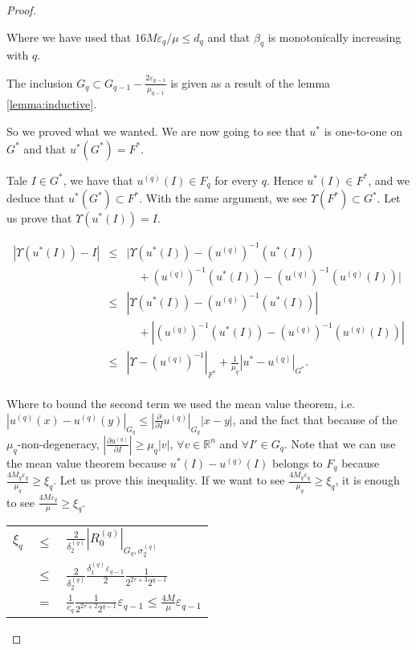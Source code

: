\begin{proof}
\begin{enumerate}
Where we have used that $16M\varepsilon_q/\mu\leq d_q$ and that $\beta_q$ is monotonically increasing with $q$.

The inclusion $G_q \subset G_{q-1} - \frac{2\varepsilon_{q-1}}{\mu_{q-1}}$ is given as a result of the lemma \ref{lemma:inductive}.

So we proved what we wanted. We are now going to see that $u^*$ is one-to-one on $G^*$ and that $u^*(G^*) = F^*$.

Tale $I\in G^*$, we have that $u^{(q)}(I)\in F_q$ for every $q$. Hence $u^*(I) \in F^*$, and we deduce that $u^*(G^*) \subset F^*$. With the same argument, we see $\Upsilon(F^*) \subset G^*$.
Let us prove that $\Upsilon(u^*(I))=I$.

$$
\begin{array}{rcl}
 |\Upsilon(u^*(I)) - I|& \leq & |\Upsilon(u^*(I)) - (u^{(q)})^{-1}(u^* (I)) \\
 & & \quad + (u^{(q)})^{-1}(u^*(I)) - (u^{(q)})^{-1}(u^{(q)}(I))|\\
 & \leq & |\Upsilon(u^*(I)) - (u^{(q)})^{-1}(u^* (I))| \\
 & & \quad + |(u^{(q)})^{-1}(u^*(I)) - (u^{(q)})^{-1}(u^{(q)}(I))|\\
 & \leq & |\Upsilon - (u^{(q)})^{-1}|_{F^*} + \frac{1}{\mu_q}|u^* -u^{(q)}|_{G^*}.\\
\end{array}
$$

Where to bound the second term we used the mean value theorem, i.e. $|u^{(q)}(x) - u^{(q)}(y)|_{G_q} \leq |\frac{\partial}{\partial I} u^{(q)}|_{G_q}|x-y|$, and the fact that because of the $\mu_q$-non-degeneracy, $|\frac{\partial u^{(q)}}{\partial I}| \geq \mu_q|v|$, $\forall v \in \mathbb{R}^n$ and $\forall I' \in G_q$.
Note that we can use the mean value theorem because $u^*(I) - u^{(q)}(I)$ belongs to $F_q$ because $\frac{4 M_q \varepsilon_q}{\mu_q} \geq \xi_q$. Let us prove this inequality. If we want to see $\frac{4 M_q \varepsilon_q}{\mu_q} \geq \xi_q$, it is enough to see $\frac{4 M \varepsilon_q}{\mu} \geq \xi_q$.

\begin{longtable}{rcl}
$\xi_q$ & $\leq$ & $\frac{2}{\delta_2^{(q)}} |R_0^{(q)}|_{G_q,\sigma_2^{(q)}}$\\
& $\leq$ & $\frac{2}{\delta_2^{(q)}} \frac{\delta_1^{(q)}\varepsilon_{q-1}}{2}\frac{1}{2^{2\tau+3}2^{q-1}}$\\
& $=$ & $\frac{1}{c_q}\frac{1}{2^{2\tau+2}2^{q-1}}\varepsilon_{q-1} \leq \frac{4M}{\mu}\varepsilon_{q-1}$\\
\end{longtable}


\end{enumerate}
\end{proof}
